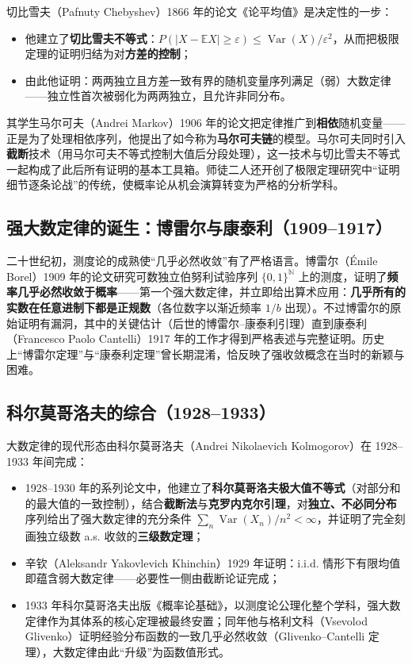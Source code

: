 切比雪夫（Pafnuty Chebyshev）1866 年的论文《论平均值》\cite{chebyshev1867}是决定性的一步：

\begin{itemize}
    \item 他建立了\textbf{切比雪夫不等式}：$P(|X - \mathbb{E}X| \geq \varepsilon) \leq \operatorname{Var}(X)/\varepsilon^2$，从而把极限定理的证明归结为对\textbf{方差的控制}；
    \item 由此他证明：两两独立且方差一致有界的随机变量序列满足（弱）大数定律——独立性首次被弱化为两两独立，且允许非同分布。
\end{itemize}

其学生马尔可夫（Andrei Markov）1906 年的论文\cite{markov1906}把定律推广到\textbf{相依}随机变量——正是为了处理相依序列，他提出了如今称为\textbf{马尔可夫链}的模型。马尔可夫同时引入\textbf{截断}技术（用马尔可夫不等式控制大值后分段处理），这一技术与切比雪夫不等式一起构成了此后所有证明的基本工具箱。师徒二人还开创了极限定理研究中“证明细节逐条论战”的传统，使概率论从机会演算转变为严格的分析学科。

\subsection{强大数定律的诞生：博雷尔与康泰利（1909--1917）}

二十世纪初，测度论的成熟使“几乎必然收敛”有了严格语言。博雷尔（\'Emile Borel）1909 年的论文\cite{borel1909}研究可数独立伯努利试验序列 $\{0,1\}^{\mathbb{N}}$ 上的测度，证明了\textbf{频率几乎必然收敛于概率}——第一个强大数定律，并立即给出算术应用：\textbf{几乎所有的实数在任意进制下都是正规数}（各位数字以渐近频率 $1/b$ 出现）。不过博雷尔的原始证明有漏洞，其中的关键估计（后世的博雷尔--康泰利引理）直到康泰利（Francesco Paolo Cantelli）1917 年的工作\cite{cantelli1917}才得到严格表述与完整证明。历史上“博雷尔定理”与“康泰利定理”曾长期混淆，恰反映了强收敛概念在当时的新颖与困难。

\subsection{科尔莫哥洛夫的综合（1928--1933）}

大数定律的现代形态由科尔莫哥洛夫（Andrei Nikolaevich Kolmogorov）在 1928--1933 年间完成：

\begin{itemize}
    \item 1928--1930 年的系列论文\cite{kolmogorov1928}中，他建立了\textbf{科尔莫哥洛夫极大值不等式}（对部分和的最大值的一致控制），结合\textbf{截断法}与\textbf{克罗内克尔引理}，对\textbf{独立、不必同分布}序列给出了强大数定律的充分条件 $\sum_n \operatorname{Var}(X_n)/n^2 < \infty$，并证明了完全刻画独立级数 a.s. 收敛的\textbf{三级数定理}；
    \item 辛钦（Aleksandr Yakovlevich Khinchin）1929 年证明：i.i.d. 情形下有限均值即蕴含弱大数定律\cite{khinchin1929}——必要性一侧由截断论证完成；
    \item 1933 年科尔莫哥洛夫出版《概率论基础》\cite{kolmogorov1933}，以测度论公理化整个学科，强大数定律作为其体系的核心定理被最终安置；同年他与格利文科（Vsevolod Glivenko）证明经验分布函数的一致几乎必然收敛（Glivenko--Cantelli 定理\cite{glivenko1933}），大数定律由此“升级”为函数值形式。
\end{itemize}

